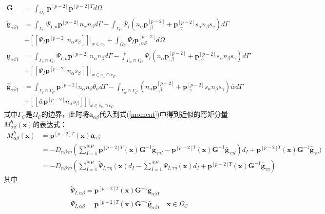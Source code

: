 \begin{align}
\label{PG}\pmb{G}&=\int_{\Omega_C}\pmb{p}^{[p-2]}\pmb{p}^{[p-2]T}d\Omega\\
\label{Pg1}\tilde{\pmb g}_{\alpha\beta I}&=\int_{\Gamma_C}\Psi_{I,n}\pmb{p}^{[p-2]}n_{\alpha}n_{\beta}d\Gamma-\int_{\Gamma_C}\Psi_I(n_{\alpha}\pmb{p}^{[p-2]}_{,\beta}+\pmb{p}^{[p-2]}_{,\gamma}s_{\alpha}n_{\beta}s_{\gamma})d\Gamma \nonumber\\
&+[[\Psi_I\pmb{p}^{[p-2]}n_{\alpha}s_{\beta}]]\vert_{x\in c_C}+\int_{\Omega_C}\Psi_I\pmb{p}^{[p-2]}_{,\alpha\beta}d\Omega\\
\label{Pg2}\bar{\pmb g}_{\alpha\beta I}&=\int_{{\Gamma_{\theta}}\cap{\Gamma_C}}\Psi_{I,n}\pmb{p}^{[p-2]}n_{\alpha}n_{\beta}d\Gamma-\int_{{\Gamma_w}\cap{\Gamma_C}}\Psi_I(n_{\alpha}\pmb{p}^{[p-2]}_{,\beta}+\pmb{p}^{[p-2]}_{,\gamma}s_{\alpha}n_{\beta}s_{\gamma})d\Gamma\nonumber\\
&+[[\Psi_I\pmb{p}^{[p-2]}n_{\alpha}s_{\beta}]]\vert_{x\in{c_w}\cap{c_C}}\\
\label{Pg3}\hat{\pmb g}_{\alpha\beta I}&=\int_{{\Gamma_{\theta}}\cap{\Gamma_C}}\pmb{p}^{[p-2]}n_{\alpha}n_{\beta}\bar{\theta}_nd\Gamma-\int_{{\Gamma_w}\cap{\Gamma_C}}(n_{\alpha}\pmb{p}^{[p-2]}_{,\beta}+\pmb{p}^{[p-2]}_{,\gamma}s_{\alpha}n_{\beta}s_{\gamma})\bar{w}d\Gamma\nonumber\\
&+[[\bar{w}\pmb{p}^{[p-2]}n_{\alpha}s_{\beta}]]\vert_{x\in{c_w}\cap{c_C}}
\end{align}
式中$\Gamma_C$是$\Omega_C$的边界，此时将$\pmb{a}_{\alpha\beta}$代入到式(\ref{moment})中得到近似的弯矩分量$M^h_{\alpha\beta}(\pmb{x})$的表达式：
\begin{equation}
\begin{split}
M^h_{\alpha\beta}(\pmb{x})&=\pmb{p}^{[p-2]T}(\pmb{x})\pmb a_{\alpha\beta}\\
&=-D_{\alpha\beta\gamma\eta}(\sum_{I=1}^{N\!P}\pmb{p}^{[p-2]T}(\pmb x)\pmb G^{-1}\tilde{\pmb g}_{\gamma\eta I}-\pmb{p}^{[p-2]T}(\pmb x)\pmb G^{-1}\bar{\pmb g}_{\gamma\eta I})d_I+\pmb{p}^{[p-2]T}(\pmb x)\pmb G^{-1}\hat{\pmb g}_{\gamma\eta})\\
&=-D_{\alpha\beta\gamma\eta}(\sum_{I=1}^{N\!P}\tilde{\Psi}_{I,\gamma\eta}(\pmb x)d_I-\sum_{I=1}^{N\!P}\bar{\Psi}_{I,\gamma\eta}(\pmb{x})d_I+\pmb{p}^{[p-2]T}(\pmb x)\pmb G^{-1}\hat{\pmb g}_{\gamma\eta})
\end{split}
\end{equation}
其中
\begin{align}
 \label{PTPSI}&\tilde{\Psi}_{I,\alpha\beta}=\pmb{p}^{[p-2]T}(\pmb x)\pmb G^{-1}\tilde{\pmb g}_{\alpha\beta I}\\
 \label{PBPSI}&\bar{\Psi}_{I,\alpha\beta}=\pmb{p}^{[p-2]T}(\pmb x)\pmb G^{-1}\bar{\pmb g}_{\alpha\beta I}\quad \pmb{x}\in\Omega_C
\end{align}\par
